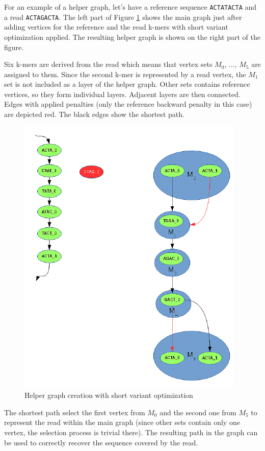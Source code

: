For an example of a helper graph, let's have a reference sequence \texttt{ACTATACTA} and a read \texttt{ACTAGACTA}. The left part of Figure \ref{fig:helper-graph-short} shows the main graph just after adding vertices for the reference and the read k-mers with short variant optimization applied. The resulting helper graph is shown on the right part of the figure.

Six k-mers are derived from the read which means that vertex sets $M_0$, ..., $M_5$ are assigned to them. Since the second k-mer is represented by a read vertex, the $M_1$ set is not included as a layer of the helper graph. Other sets contains reference vertices, so they form individual layers. Adjacent layers are then connected. Edges with applied penalties (only the reference backward penalty in this case) are depicted red. The black edges show the shortest path.

\begin{figure}[h]
	\centering
	\includegraphics{img/helper-graph-short.pdf}
	\caption{Helper graph creation with short variant optimization}
	\label{fig:helper-graph-short}
\end{figure}

The shortest path select the first vertex from $M_0$ and the second one from $M_5$ to represent the read within the main graph (since other sets contain only one vertex, the selection process is trivial there). The resulting path in the graph can be used to correctly recover the sequence covered by the read.

